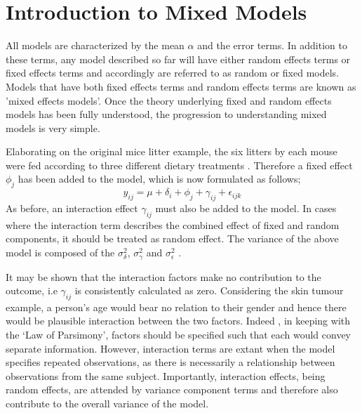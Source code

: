 \documentclass[MAIN.tex]{subfiles}
\begin{document}
\section{Introduction to Mixed Models}


All models are characterized by the mean $\alpha$ and the error
terms. In addition to these terms, any model described so far will
have either random effects terms or fixed effects terms and
accordingly are referred to as random or fixed models. Models that
have both fixed effects terms and random effects terms are known
as 'mixed effects models'. Once the theory underlying fixed and
random effects models has been fully understood, the progression
to understanding mixed models is very simple.

Elaborating on the original mice litter example, the six litters
by each mouse were fed according to three different dietary
treatments \citep{Searle}. Therefore a fixed effect $\phi_{j}$ has
been added to the model, which is now formulated as follows;
\begin{equation}
y_{ij} = \mu + \delta_{i} + \phi_{j} + \gamma_{ij} +
\epsilon_{ijk}
\end{equation}
As before, an interaction effect $\gamma_{ij}$ must also be added
to the model. In cases where the interaction term describes the
combined effect of fixed and random components, it should be
treated as random effect. The variance of the above model is
composed of the $\sigma^{2}_{\delta}$, $\sigma^{2}_{\gamma}$ and
$\sigma^{2}_{\epsilon}$ .


It may be shown that the interaction factors make no contribution
to the outcome, i.e $\gamma_{ij}$ is consistently calculated as
zero. Considering the skin tumour example, a person's age would
bear no relation to their gender and hence there would be
plausible interaction between the two factors. Indeed , in keeping
with the `Law of Parsimony', factors should be specified such that
each would convey separate information. However, interaction terms
are extant when the model specifies repeated observations, as
there is necessarily a relationship between observations from the
same subject. Importantly, interaction effects, being random
effects, are attended by variance component terms and therefore
also contribute to the overall variance of the model.
\end{document}
